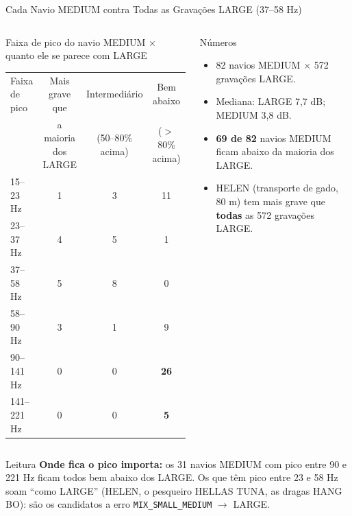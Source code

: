 \documentclass[aspectratio=169]{beamer}
\newcommand{\cahi}[1]{\cellcolor{green!30}\textbf{#1}}
\newcommand{\camd}[1]{\cellcolor{yellow!35}#1}
\newcommand{\mix}{\texttt{MIX\_SMALL\_MEDIUM}}
\begin{document}
\begin{frame}{Cada Navio MEDIUM contra Todas as Gravações LARGE (37--58 Hz)}
    \footnotesize
    \begin{columns}[t]
        \begin{block}{\small Faixa de pico do navio MEDIUM $\times$ quanto ele se parece com LARGE}
            \tiny
            \centering
            \setlength{\tabcolsep}{3pt}
            \begin{tabular}{lccc}
            \toprule
            Faixa de pico & Mais grave que & Intermediário & Bem abaixo \\
             & a maioria dos LARGE & (50--80\% acima) & ($>$80\% acima) \\
            \midrule
            15--23 Hz & 1 & 3 & 11 \\
            23--37 Hz & \camd{4} & \camd{5} & 1 \\
            37--58 Hz & \camd{5} & \camd{8} & 0 \\
            58--90 Hz & 3 & 1 & 9 \\
            90--141 Hz & 0 & 0 & \cahi{26} \\
            141--221 Hz & 0 & 0 & \cahi{5} \\
            \bottomrule
            \end{tabular}
        \end{block}
        \begin{block}{\small Números}
            \scriptsize
            \begin{itemize}
                \setlength{\itemsep}{1pt}
                \item 82 navios MEDIUM $\times$ 572 gravações LARGE.
                \item Mediana: LARGE 7,7 dB; MEDIUM 3,8 dB.
                \item \textbf{69 de 82} navios MEDIUM ficam abaixo da maioria dos LARGE.
                \item HELEN (transporte de gado, 80 m) tem mais grave que \textbf{todas} as 572 gravações LARGE.
            \end{itemize}
        \end{block}
    \end{columns}
    \vspace{0.05cm}
    \begin{alertblock}{Leitura}
        \scriptsize
        \textbf{Onde fica o pico importa:} os 31 navios MEDIUM com pico entre 90 e 221 Hz ficam todos bem abaixo dos LARGE. Os que têm pico entre 23 e 58 Hz soam ``como LARGE'' (HELEN, o pesqueiro HELLAS TUNA, as dragas HANG BO): são os candidatos a erro \mix{} $\rightarrow$ LARGE.
    \end{alertblock}
\end{frame}
\end{document}
